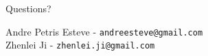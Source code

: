 \documentclass{beamer}
\begin{document}

\begin{frame}[plain]

  \begin{center}
    \Huge Questions?
  \end{center}

  \vspace{0.2in}

  \begin{center}
	Andre Petris Esteve - \texttt{andreesteve@gmail.com}\\
	Zhenlei Ji - \texttt{zhenlei.ji@gmail.com}
  \end{center}
\end{frame}
\end{document}
